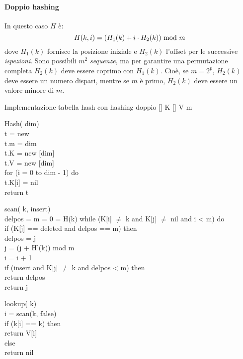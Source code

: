 \paragraph{Doppio hashing}
In questo caso $H$ è:
\[H(k,i)=(H_1(k)+i\cdot H_2(k))\ \mathrm{mod}\ m\]
dove $H_1(k)$ fornisce la posizione iniziale e $H_2(k)$ l'offset per le
successive \emph{ispezioni}. Sono possibili $m^2$ \emph{sequenze}, ma per
garantire una permutazione completa $H_2(k)$ deve essere coprimo con $H_1(k)$.
Cioè, se $m=2^p$, $H_2(k)$ deve essere un numero dispari, mentre se $m$ è
primo, $H_2(k)$ deve essere un valore minore di $m$.

\begin{minicode}{Implementazione tabella hash con hashing doppio}
[] K\hfill{}
[] V\hfill{}
 m\hfill{}

\nl\ind{} Hash( dim)\\
     t = new \\
    t.m = dim\\
    t.K = new [dim]\\
    t.V = new [dim]\\
    \indf for (i = 0 to dim - 1) do\\
        t.K[i] = nil\\
    \indf return t

\nl{}
\rmbreak\ind{} scan( k,  insert)\\
     delpos = m\hfill{}
     = 0\hfill{}
     = H(k)\hfill{}
    \indf while (K[i] $\neq$ k and K[j] $\neq$ nil and i < m) do\\
        \indff if (K[j] == deleted and delpos == m) then\\
            delpos = j\\
        \indff j = (j + H'(k)) mod m\\
        \indff i = i + 1\\
    \indf if (insert and K[j] $\neq$ k and delpos < m) then\\
        return delpos\\
    \indf return j

\nl{}
\rmbreak\ind{} lookup( k)\\
     i = scan(k, false)\\
    \indf if (k[i] == k) then\\
        return V[i]\\
    \indf else\\
        return nil
\end{minicode}
